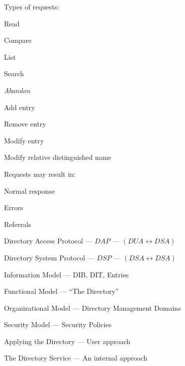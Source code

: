 \begin{bwslide}
Types of requests:
\begin{nrtc}
\item	Read
\item	Compare
\item	List
\item	Search
\item	{\em Abandon}
\end{nrtc}
\end{bwslide}

\begin{bwslide}
\begin{nrtc}
\item	Add entry
\item	Remove entry
\item	Modify entry
\item	Modify relative distinguished name
\end{nrtc}
\end{bwslide}


\begin{bwslide}
Requests may result in:
\begin{nrtc}
\item	Normal response
\item	Errors
\item	Referrals
\end{nrtc}
\end{bwslide}

\begin{bwslide}

\begin{nrtc}
\item	Directory Access Protocol --- $DAP$ --- $(DUA \longleftrightarrow DSA)$
\item	Directory System Protocol --- $DSP$ --- $(DSA \longleftrightarrow DSA)$
\end{nrtc}
\end{bwslide}


\begin{bwslide}

\begin{nrtc}
\item	Information Model --- DIB, DIT, Entries
\item	Functional Model --- ``The Directory''
\item	Organizational Model --- Directory Management Domains
\item	Security Model --- Security Policies
\item	Applying the Directory --- User approach
\item	The Directory Service --- An internal approach
\end{nrtc}
\end{bwslide}

